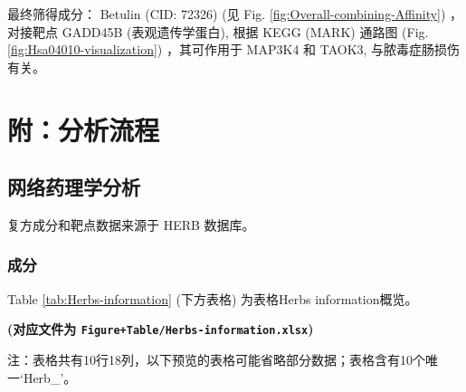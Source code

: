 \documentclass[
]{article}
\begin{document}
最终筛得成分： Betulin (CID: 72326) (见 Fig. \ref{fig:Overall-combining-Affinity}) ，对接靶点 GADD45B (表观遗传学蛋白),
根据 KEGG (MARK) 通路图 (Fig. \ref{fig:Hsa04010-visualization}) ，其可作用于 MAP3K4 和 TAOK3, 与脓毒症肠损伤有关。

\hypertarget{workflow}{%
\section{附：分析流程}\label{workflow}}

\hypertarget{ux7f51ux7edcux836fux7406ux5b66ux5206ux6790}{%
\subsection{网络药理学分析}\label{ux7f51ux7edcux836fux7406ux5b66ux5206ux6790}}

复方成分和靶点数据来源于 HERB 数据库。

\hypertarget{ux6210ux5206}{%
\subsubsection{成分}\label{ux6210ux5206}}

Table \ref{tab:Herbs-information} (下方表格) 为表格Herbs information概览。

\textbf{(对应文件为 \texttt{Figure+Table/Herbs-information.xlsx})}

\begin{center}\begin{tcolorbox}[colback=gray!10, colframe=gray!50, width=0.9\linewidth, arc=1mm, boxrule=0.5pt]注：表格共有10行18列，以下预览的表格可能省略部分数据；表格含有10个唯一`Herb\_'。
\end{tcolorbox}
\end{center}
\end{document}
